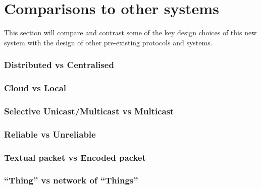 


\section{Comparisons to other systems}
This section will compare and contrast some of the key design choices of this new system with the design of other pre-existing protocols and systems. 

\subsubsection{Distributed vs Centralised} %
\label{ssub:distributed_vs_centralised}

\subsubsection{Cloud vs Local} %
\label{ssub:cloud_vs_local}

\subsubsection{Selective Unicast/Multicast vs Multicast} %
\label{ssub:selective_unicast_multicast_vs_multicast}

\subsubsection{Reliable vs Unreliable} %
\label{ssub:reliable_vs_unreliable}


\subsubsection{Textual packet vs Encoded packet} %
\label{ssub:textual_packet_vs_encoded_packet}

\subsubsection{``Thing'' vs network of ``Things''} %
\label{ssub:_thing_vs_network_of_things_}

